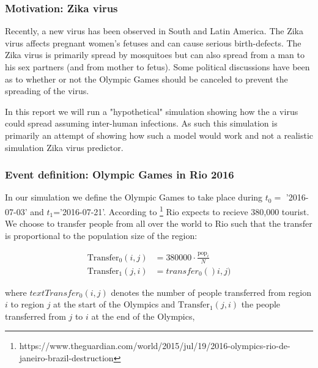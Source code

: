 \subsubsection{Motivation: Zika virus}
Recently, a new virus has been observed in South and Latin America. The Zika virus affects pregnant women's fetuses and can cause serious birth-defects. The Zika virus is primarily spread by mosquitoes but can also spread from a man to his sex partners (and from mother to fetus). Some political discussions have been as to whether or not the Olympic Games should be canceled to prevent the spreading of the virus. 

In this report we will run a "hypothetical" simulation showing how the a virus could spread assuming inter-human infections. As such this simulation is primarily an attempt of showing how such a model would work and not a realistic simulation Zika virus predictor.

\subsubsection{Event definition: Olympic Games in Rio 2016}
In our simulation we define the Olympic Games to take place during $t_0=$ '2016-07-03' and $t_1$='2016-07-21'. According to \footnote{ https://www.theguardian.com/world/2015/jul/19/2016-olympics-rio-de-janeiro-brazil-destruction} Rio expects to recieve 380,000 tourist. We choose to transfer people from all over the world to Rio such that the transfer is proportional to the population size of the region:

\begin{align}
	\text{Transfer}_0(i, j) &= 380000 \cdot \frac{ \text{pop}_i}{N} \\
	\text{Transfer}_1(j, i) &= transfer_0()i, j)
\end{align}

where $text{Transfer}_0(i, j) $ denotes the number of people transferred from region $i$ to region $j$ at the start of the Olympics and $ \text{Transfer}_1(j, i) $ the people transferred from $j$ to $i$ at the end of the Olympics,